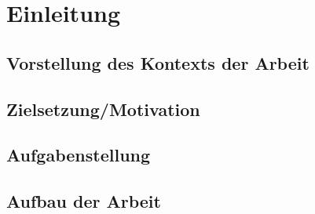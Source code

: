 \chapter{Einleitung}
\blindtext

\section{Vorstellung des Kontexts der Arbeit}
\blindtext

\section{Zielsetzung/Motivation}
\Blindtext

\section{Aufgabenstellung}
\blindtext

\section{Aufbau der Arbeit}
\blindtext